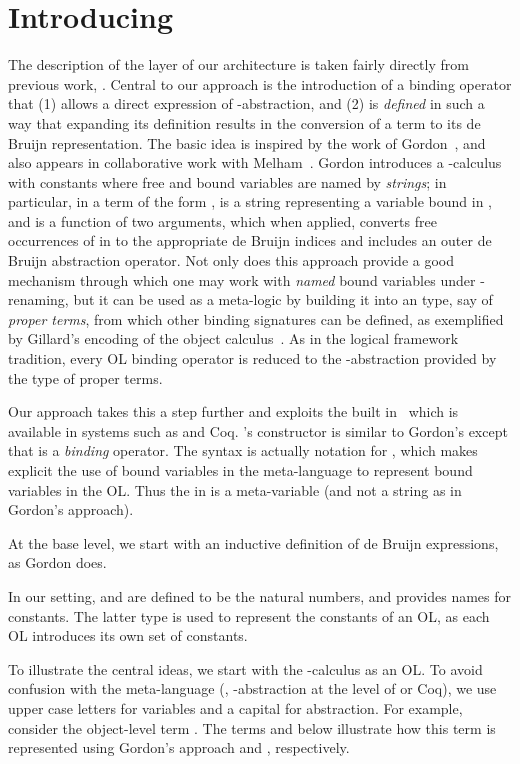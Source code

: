 \documentclass[final]{svjour3}
\begin{document}
\section{Introducing \hybrid}
\label{sec:introh}



The description of the \hybrid layer of our architecture is taken fairly
directly from previous work, \viz \cite{Ambler02}.  Central to our
approach is the introduction of a binding operator that (1) allows a
direct expression of -abstraction, and (2) is \emph{defined}
in such a way that expanding its definition results in the conversion
of a term to its de Bruijn representation.  The basic idea is inspired
by the work of Gordon~\cite{Gor93}, and also appears in collaborative
work with Melham~\cite{Gordon96}.  Gordon introduces a
-calculus with constants where free and bound variables are
named by \emph{strings}; in particular, in a term of the form
,  is a string
representing a variable bound in , and  is a function
of two arguments, which when applied, converts free occurrences of
 in  to the appropriate de Bruijn indices and includes an
outer de Bruijn abstraction operator.  Not only does this approach
provide a good mechanism through which one may work with \emph{named}
bound variables under -renaming, but it can be used as a
meta-logic by building it into an \HOL type, say of \emph{proper
  terms}, from which other binding signatures can be defined, as
exemplified by Gillard's encoding of the object calculus~\cite{Gillard00}. As
in the logical framework tradition, every OL binding operator is
reduced to the -abstraction provided by the type of proper
terms.


Our approach
takes this a step further and exploits the built in \hoas\ which is
available in systems such as \HOL and Coq.
\hybrid's  constructor is similar to Gordon's 
except that  is a \emph{binding} operator.  The syntax
 is actually notation for
, which makes explicit the use of {bound
variables in the meta-language} to represent {bound variables in the
OL}.  Thus the  in  is
a meta-variable (and not a string as in Gordon's approach).  

At the base level, we start with an inductive definition of de Bruijn
expressions, as Gordon does.

In our setting,  and  are defined to be the natural
numbers, and  provides names for constants.  The latter type is
used to represent the constants of an OL, as each
OL introduces its own set of constants.

To illustrate the central ideas, we start with the -calculus
as an OL\@.  To avoid confusion with the meta-language
(\ie, -abstraction at the level of \HOL or Coq), we use
upper case letters for variables and a capital  for
abstraction.  For example, consider the object-level term 
.
The terms  and  below illustrate how this term is
represented using Gordon's approach and \hybrid, respectively.
\end{document}
